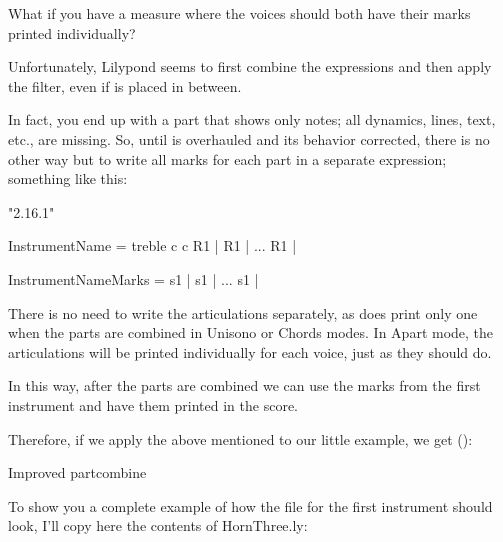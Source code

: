 \documentclass[../../LilyPond-Tutorials]{subfiles}
\begin{document}
\begin{enumerate*}
\item What if you have a measure where the voices should both have their marks printed individually?
\item Unfortunately, Lilypond seems to first combine the expressions and then apply the filter, even if  is placed in between.
\end{enumerate*}

In fact, you end up with a part that shows only notes; all dynamics, lines, text, etc., are missing.
So, until  is overhauled and its behavior corrected, there is no other way but to write all marks for each part in a separate expression; something like this:

\begin{lilypondcode}
\version "2.16.1"


InstrumentName = { %
       \clef treble
       \key c \major
       \relative c {
              \PersonalSettings
              R1 | %
              R1 | %
              ...
              R1 | %
       }
}

InstrumentNameMarks = { %
       s1 | %
       s1 | %
       ...
       s1 | %
}
\end{lilypondcode}

There is no need to write the articulations separately, as  does print only one when the parts are combined in Unisono or Chords modes.
In Apart mode, the articulations will be printed individually for each voice, just as they should do.

In this way, after the parts are combined we can use the marks from the first instrument and have them printed in the score.

Therefore, if we apply the above mentioned to our little example, we get ():

\begin{musicExample}
\caption{Improved partcombine}
\label{xmp:partcombine-example-two}
\end{musicExample}

To show you a complete example of how the file for the first instrument should look, I'll copy here the contents of HornThree.ly:
\end{document}
